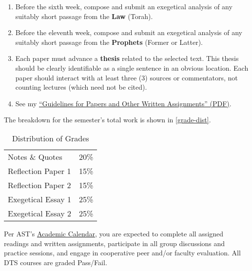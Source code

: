 \documentclass[titlepage]{article}
\begin{document}
\begin{enumerate}
	\begin{enumerate}

		\item Before the sixth week, compose and submit an exegetical
		analysis of any suitably short passage from the \textbf{Law}
		(Torah).

		\item Before the eleventh week, compose and submit an
		exegetical analysis of any suitably short passage from the
		\textbf{Prophets} (Former or Latter).

		\item Each paper must advance a \textbf{thesis} related to the
		selected text. This thesis should be clearly identifiable as a
		single sentence in an obvious location. Each paper should
		interact with at least three (3) sources or commentators, not
		counting lectures (which need not be cited).
		
		\item See my \href{https://danieldriver.com/assets/pdf/handouts/Guidelines_for_Papers.pdf}{“Guidelines for Papers and Other Written Assignments” (PDF)}.

	\end{enumerate}

\end{enumerate}

The breakdown for the semester's total work is shown in
\autoref{grade-dist}.

\begin{table}[htbp]
  \centering
  {\lining
  \begin{tabular}{lr}
    \toprule
    Notes \& Quotes     & 20\% \\
    Reflection Paper 1  & 15\% \\
    Reflection Paper 2  & 15\% \\
    Exegetical Essay 1  & 25\% \\
    Exegetical Essay 2  & 25\% \\
    \bottomrule
  \end{tabular}}
  \caption{Distribution of Grades}
  \label{grade-dist}
\end{table}

Per AST's \href{https://www.astheology.ns.ca/students/resources.html}{Academic Calendar},
you are expected to complete all assigned readings and written
assignments, participate in all group discussions and practice sessions,
and engage in cooperative peer and/or faculty evaluation. All DTS
courses are graded Pass/Fail.
\end{document}
